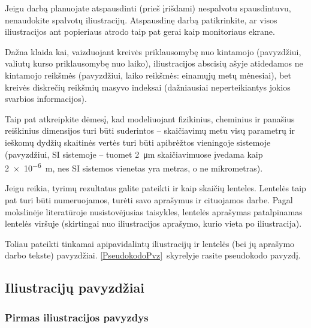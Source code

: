 \documentclass[a4paper,12pt]{article}
\begin{document}
\noindent
{\footnotesize
{}

}

Jeigu darbą planuojate atspausdinti (prieš įrišdami) nespalvotu spausdintuvu, nenaudokite spalvotų iliustracijų.
Atspausdinę darbą patikrinkite, ar visos iliustracijos ant popieriaus atrodo taip pat gerai kaip monitoriaus ekrane.

Dažna klaida kai, vaizduojant kreivės priklausomybę nuo kintamojo (pavyzdžiui, valiutų kurso priklausomybę nuo laiko),
iliustracijos abscisių ašyje atidedamos ne kintamojo reikšmės (pavyzdžiui, laiko reikšmės: einamųjų metų mėnesiai), bet kreivės diskrečių reikšmių masyvo indeksai
(dažniausiai neperteikiantys jokios svarbios informacijos).

Taip pat atkreipkite dėmesį, kad modeliuojant fizikinius, cheminius ir panašius reiškinius dimensijos turi būti suderintos --
skaičiavimų metu visų parametrų ir ieškomų dydžių skaitinės vertės turi būti apibrėžtos vieningoje sistemoje
(pavyzdžiui, SI sistemoje -- tuomet \SI{2}{\micro\meter} skaičiavimuose įvedama kaip \SI{2e-6}{\meter}, nes SI sistemos vienetas yra metras, o ne mikrometras).

Jeigu reikia, tyrimų rezultatus galite pateikti ir kaip skaičių lenteles.
Lentelės taip pat turi būti numeruojamos, turėti savo aprašymus ir cituojamos darbe.
Pagal mokslinėje literatūroje nusistovėjusias taisykles, lentelės aprašymas patalpinamas lentelės viršuje (skirtingai nuo iliustracijos aprašymo, kurio vieta po iliustracija).

Toliau pateikti tinkamai apipavidalintų iliustracijų ir lentelės (bei jų aprašymo darbo tekste) pavyzdžiai.
\ref{PseudokodoPvz}~skyrelyje rasite pseudokodo pavyzdį.

\subsection{Iliustracijų pavyzdžiai}

\subsubsection{Pirmas iliustracijos pavyzdys}
\end{document}
